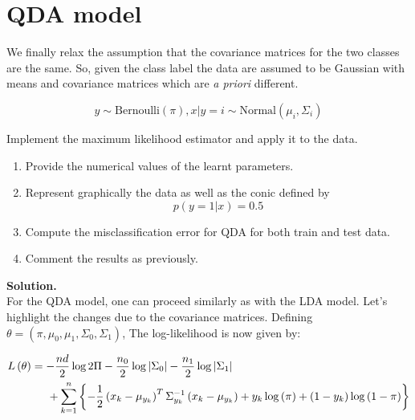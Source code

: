 \documentclass[a4paper, 11pt]{report}
\begin{document}
\section{QDA model}

We finally relax the assumption that the covariance matrices for the two classes are the same. So, given the class label the data are assumed to be Gaussian with means and covariance matrices which are \textit{a priori} different.

\begin{equation*}
    y \sim \text{Bernoulli} \left( \pi \right), x|y = i \sim \text{Normal} \left( \mu_{i}, \Sigma_{i} \right)
\end{equation*}

Implement the maximum likelihood estimator and apply it to the data.

\begin{enumerate}[label=\alph*]
    \item Provide the numerical values of the learnt parameters.
    
    \item Represent graphically the data as well as the conic defined by
    \begin{equation*}
        p \left( y = 1 | x \right) = 0.5
    \end{equation*}
    
    \item Compute the misclassification error for QDA for both train and test data.
    
    \item Comment the results as previously.
\end{enumerate}

\textbf{Solution.} \\

For the QDA model, one can proceed similarly as with the LDA model. Let's highlight the changes due to the covariance matrices. Defining $\theta = \left( \pi, \mu_{0}, \mu_{1}, \Sigma_{0}, \Sigma_{1} \right)$, The log-likelihood is now given by:

\begin{equation*}
    \begin{aligned}
    L \left( \theta \right) &= - \frac{nd}{2} \log 2 \Pi - \frac{n_{0}}{2} \log \left| \Sigma_{0} \right| - \frac{n_{1}}{2} \log \left| \Sigma_{1} \right| \\
    &\hspace*{.5cm} + \sum_{k=1}^{n} \left\{ - \frac{1}{2} \left( x_k - \mu_{y_k} \right)^{T} \Sigma^{-1}_{y_{k}} \left( x_k - \mu_{y_k} \right) + y_{k} \log \left( \pi \right) + \left( 1 - y_{k} \right) \log \left( 1 - \pi \right) \right\}
    \end{aligned}
\end{equation*}
\end{document}
